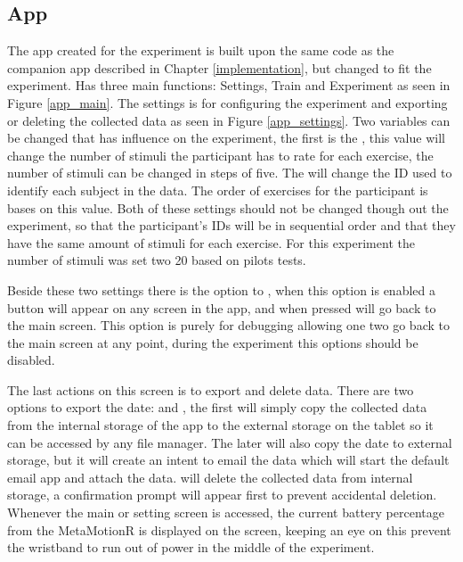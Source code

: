 \subsection{App}
The app created for the experiment is built upon the same code as the companion app described in Chapter \ref{implementation}, but changed to fit the experiment. Has three main functions: Settings, Train and Experiment as seen in Figure \ref{app_main}. The settings is for configuring the experiment and exporting or deleting the collected data as seen in Figure \ref{app_settings}. Two variables can be changed that has influence on the experiment, the first is the , this value will change the number of stimuli the participant has to rate for each exercise, the number of stimuli can be changed in steps of five. The  will change the ID used to identify each subject in the data. The order of exercises for the participant is bases on this value. Both of these settings should not be changed though out the experiment, so that the participant's IDs will be in sequential order and that they have the same amount of stimuli for each exercise. For this experiment the number of stimuli was set two 20 based on pilots tests.

Beside these two settings there is the option to , when this option is enabled a  button will appear on any screen in the app, and when pressed will go back to the main screen. This option is purely for debugging allowing one two go back to the main screen at any point, during the experiment this options should be disabled. 

The last actions on this screen is to export and delete data. There are two options to export the date:  and , the first will simply copy the collected data from the internal storage of the app to the external storage on the tablet so it can be accessed by any file manager. The later will also copy the date to external storage, but it will create an intent to email the data which will start the default email app and attach the data.  will delete the collected data from internal storage, a confirmation prompt will appear first to prevent accidental deletion. Whenever the main or setting screen is accessed, the current battery percentage from the MetaMotionR is displayed on the screen, keeping an eye on this prevent the wristband to run out of power in the middle of the experiment.

